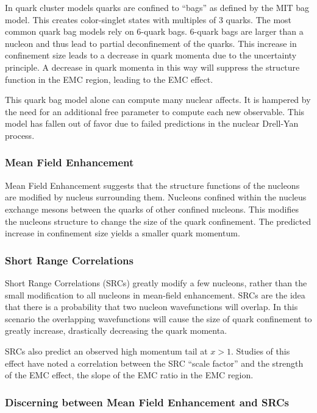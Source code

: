 In quark cluster models quarks are confined to ``bags'' as defined by the MIT bag model. This creates color-singlet states with multiples of 3 quarks. The most common quark bag models rely on 6-quark bags. 6-quark bags are larger than a nucleon and thus lead to partial deconfinement of the quarks. This increase in confinement size leads to a decrease in quark momenta due to the uncertainty principle. A decrease in quark momenta in this way will suppress the structure function in the EMC region, leading to the EMC effect. \cite{Norton,HenSRC}

This quark bag model alone can compute many nuclear affects. It is hampered by the need for an additional free parameter to compute each new observable. This model has fallen out of favor due to failed predictions in the nuclear Drell-Yan process. \cite{HenSRC}

\subsubsection{Mean Field Enhancement}

Mean Field Enhancement suggests that the structure functions of the nucleons are modified by nucleus surrounding them. Nucleons confined within the nucleus exchange mesons between the quarks of other confined nucleons. This modifies the nucleons structure to change the size of the quark confinement. The predicted increase in confinement size yields a smaller quark momentum. \cite{HenSRC,Daniel_thesis}

\subsubsection{Short Range Correlations}

Short Range Correlations (SRCs) greatly modify a few nucleons, rather than the small modification to all nucleons in mean-field enhancement. SRCs are the idea that there is a probability that two nucleon wavefunctions will overlap. In this scenario the overlapping wavefunctions will cause the size of quark confinement to greatly increase, drastically decreasing the quark momenta.

SRCs also predict an observed high momentum tail at $x>1$. Studies of this effect have noted a correlation between the SRC ``scale factor'' and the strength of the EMC effect, the slope of the EMC ratio in the EMC region. \cite{HenSRC,CLASSRC,WeinsteinSRC}

\subsubsection{Discerning between Mean Field Enhancement and SRCs}

